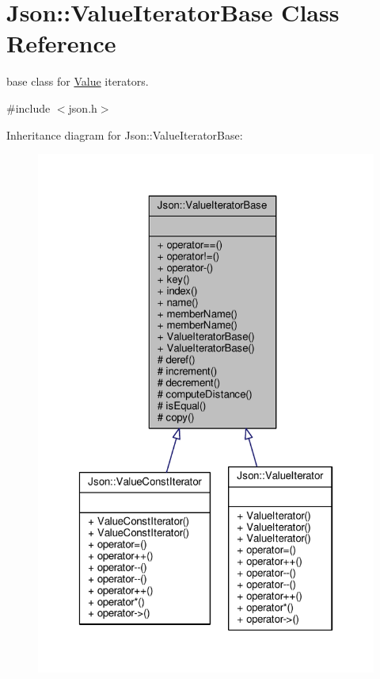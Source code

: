\hypertarget{classJson_1_1ValueIteratorBase}{}\section{Json\+:\+:Value\+Iterator\+Base Class Reference}
\label{classJson_1_1ValueIteratorBase}


base class for \hyperlink{classJson_1_1Value}{Value} iterators.  




{\ttfamily \#include $<$json.\+h$>$}



Inheritance diagram for Json\+:\+:Value\+Iterator\+Base\+:
\nopagebreak
\begin{figure}[H]
\begin{center}
\leavevmode
\includegraphics[width=322pt]{d9/df6/classJson_1_1ValueIteratorBase__inherit__graph}
\end{center}
\end{figure}


